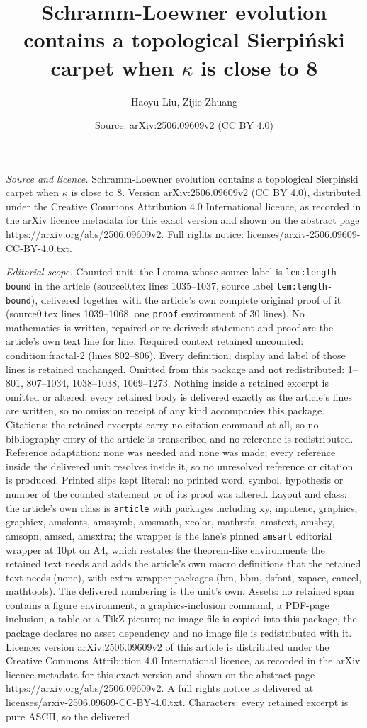 \documentclass[10pt,a4paper]{amsart}
\title[Schramm-Loewner evolution contains a topological Sierpi\'nsk]{Schramm-Loewner evolution contains a topological Sierpi\'nski carpet when $\kappa$ is close to 8}
\author{Haoyu Liu, Zijie Zhuang}
\date{Source: arXiv:2506.09609v2 (CC BY 4.0)}
\begin{document}
\maketitle

\noindent\emph{Source and licence.} Schramm-Loewner evolution contains a topological Sierpi\'nski carpet when $\kappa$ is close to 8. Version arXiv:2506.09609v2 (CC BY 4.0), distributed under the Creative Commons Attribution 4.0 International licence, as recorded in the arXiv licence metadata for this exact version and shown on the abstract page https://arxiv.org/abs/2506.09609v2. Full rights notice: licenses/arxiv-2506.09609-CC-BY-4.0.txt.\par\smallskip

\noindent\textit{Editorial scope.} Counted unit: the Lemma whose source label is \texttt{lem:length-bound} in the article (source0.tex lines 1035--1037, source label \texttt{lem:length-bound}), delivered together with the article's own complete original proof of it (source0.tex lines 1039--1068, one \texttt{proof} environment of 30 lines). No mathematics is written, repaired or re-derived: statement and proof are the article's own text line for line. Required context retained uncounted: condition:fractal-2 (lines 802--806). Every definition, display and label of those lines is retained unchanged. Omitted from this package and not redistributed: 1--801, 807--1034, 1038--1038, 1069--1273. Nothing inside a retained excerpt is omitted or altered: every retained body is delivered exactly as the article's lines are written, so no omission receipt of any kind accompanies this package. Citations: the retained excerpts carry no citation command at all, so no bibliography entry of the article is transcribed and no reference is redistributed. Reference adaptation: none was needed and none was made; every reference inside the delivered unit resolves inside it, so no unresolved reference or citation is produced. Printed slips kept literal: no printed word, symbol, hypothesis or number of the counted statement or of its proof was altered. Layout and class: the article's own class is \texttt{article} with packages including xy, inputenc, graphics, graphicx, amsfonts, amssymb, amsmath, xcolor, mathrsfs, amstext, amsbsy, amsopn, amscd, amsxtra; the wrapper is the lane's pinned \texttt{amsart} editorial wrapper at 10pt on A4, which restates the theorem-like environments the retained text needs and adds the article's own macro definitions that the retained text needs (none), with extra wrapper packages (bm, bbm, dsfont, xspace, cancel, mathtools). The delivered numbering is the unit's own. Assets: no retained span contains a figure environment, a graphics-inclusion command, a PDF-page inclusion, a table or a TikZ picture; no image file is copied into this package, the package declares no asset dependency and no image file is redistributed with it. Licence: version arXiv:2506.09609v2 of this article is distributed under the Creative Commons Attribution 4.0 International licence, as recorded in the arXiv licence metadata for this exact version and shown on the abstract page https://arxiv.org/abs/2506.09609v2. A full rights notice is delivered at licenses/arxiv-2506.09609-CC-BY-4.0.txt. Characters: every retained excerpt is pure ASCII, so the delivered 
\end{document}
